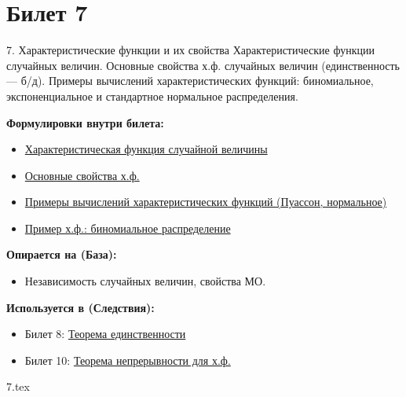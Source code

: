 \documentclass[a4paper, 12pt]{article}
\newcommand{\ticketsection}[1]{\vspace{0.5em}\noindent\textbf{\textcolor{ticketdark}{\sffamily #1}}\par}
\begin{document}
\section{Билет 7}
\begin{ticketskeleton}{7. Характеристические функции и их свойства}
     Характеристические функции случайных величин. Основные свойства х.ф. случайных величин (единственность --- б/д). Примеры вычислений характеристических функций: биномиальное, экспоненциальное и стандартное нормальное распределения.

    \ticketsection{Формулировки внутри билета:}
    \begin{itemize}
        \item \hyperref[def:char_func]{ Характеристическая функция случайной величины}
        \item \hyperref[lem:char_props]{ Основные свойства х.ф.}
        \item \hyperref[ex:char_calc]{Примеры вычислений характеристических функций (Пуассон, нормальное)}
        \item \hyperref[ex:char_binomial]{Пример х.ф.: биномиальное распределение}
    \end{itemize}

    \ticketsection{Опирается на (База):}
    \begin{itemize}
        \item Независимость случайных величин, свойства МО.
    \end{itemize}

    \ticketsection{Используется в (Следствия):}
    \begin{itemize}
        \item Билет 8: \hyperref[thm:uniqueness]{Теорема единственности}
        \item Билет 10: \hyperref[thm:continuity]{Теорема непрерывности для х.ф.}
    \end{itemize}
\end{ticketskeleton}
{7.tex}
\end{document}
